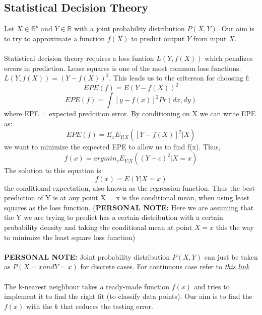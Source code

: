 \documentclass[12pt]{article}
\begin{document}
\subsection{Statistical Decision Theory}
Let $X \in \mathbb{R}^{p}$ and $Y \in \mathbb{R}$  with a joint probability distribution $P(X,Y)$. Our aim is to try to approximate a function $f(X)$ to predict output $Y$ from input $X$. 
\\ \\Statistical decision theory requires a loss funtion $L(Y,f(X))$ which penalizes errors in prediction. Lease squares is one of the most common loss functions. $L(Y,f(X)) = (Y - f(X))^{2}$. This leads us to the critereon for choosing f: 
\begin{equation}
    EPE(f) = E(Y - f(X))^{2}
\end{equation}
\begin{equation}
    EPE(f) = \int [y - f(x)]^{2} Pr(dx,dy)
\end{equation}
where EPE = expected predcition error. By conditioning on X we can write EPE as: 
\begin{equation}
    EPE(f) = E_x E_{Y|X}([Y - f(X)]^{2} | X)
\end{equation}
we want to minimize the expected EPE to allow us to find f(x). Thus, 
\begin{equation}
    f(x) = argmin_c E_{Y|X}((Y-c)^{2} | X = x)
\end{equation}
The solution to this equation is:
\begin{equation}
    f(x) = E(Y | X = x)
\end{equation}
the conditional expectation, also known as the regression function. Thus the best prediction of Y is at any point X = x is the conditional mean, when using least squares as the loss function. (\textbf{PERSONAL NOTE:} Here we are assuming that the Y we are trying to predict has a certain distribution with a certain probability density and taking the conditional mean at point $X = x$ this the way to minimize the least square loss function)
\\ \\ \textbf{PERSONAL NOTE:} Joint probability distribution $P(X,Y)$ can just be taken as $P(X=x and Y=x)$ for discrete cases. For continuous case refer to  \href{https://en.wikipedia.org/wiki/Joint_probability_distribution#math_Eq.1}{\textit{this link}}  \\ \\ 

The k-nearest neighbour takes a ready-made function $f(x)$ and tries to implement it to find the right fit (to classify data points). Our aim is to find the $f(x)$ with the $k$ that reduces the testing error.  
\end{document}
